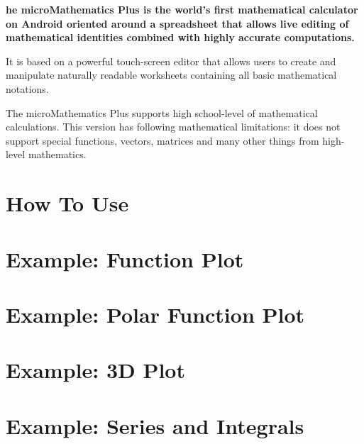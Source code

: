 \documentclass[DIV=calc, paper=a4, fontsize=11pt, twocolumn]{scrartcl}
\begin{document}
\maketitle
\thispagestyle{fancy} %

\textbf{he microMathematics Plus is the world's first mathematical
calculator on Android oriented around a spreadsheet that allows live editing
of mathematical identities combined with highly accurate computations.}

\begin{bf}
It is based on a powerful touch-screen editor that allows users to
create and manipulate naturally readable worksheets containing all basic mathematical
notations.

The microMathematics Plus supports high school-level of mathematical
calculations. This version has following mathematical limitations: it does not
support special functions, vectors, matrices and many other things from
high-level mathematics.
\end{bf}

\section{How To Use}


\section{Example: Function Plot}


\section{Example: Polar Function Plot}


\section{Example: 3D Plot}


\section{Example: Series and Integrals}

\end{document}
